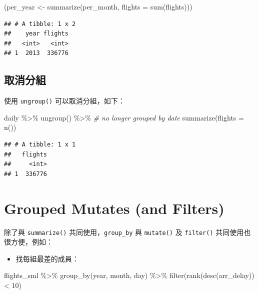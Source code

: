 \documentclass[
]{book}
\newenvironment{Shaded}{\begin{snugshade}}{\end{snugshade}}
\newcommand{\AttributeTok}[1]{\textcolor[rgb]{0.77,0.63,0.00}{#1}}
\newcommand{\CommentTok}[1]{\textcolor[rgb]{0.56,0.35,0.01}{\textit{#1}}}
\newcommand{\DecValTok}[1]{\textcolor[rgb]{0.00,0.00,0.81}{#1}}
\newcommand{\FunctionTok}[1]{\textcolor[rgb]{0.00,0.00,0.00}{#1}}
\newcommand{\NormalTok}[1]{#1}
\newcommand{\OtherTok}[1]{\textcolor[rgb]{0.56,0.35,0.01}{#1}}
\newcommand{\SpecialCharTok}[1]{\textcolor[rgb]{0.00,0.00,0.00}{#1}}
\providecommand{\tightlist}{%
  \setlength{\itemsep}{0pt}\setlength{\parskip}{0pt}}
\theoremstyle{definition}
\theoremstyle{remark}
\begin{document}
\begin{Shaded}
\begin{Highlighting}[]
\NormalTok{(per\_year }\OtherTok{\textless{}{-}} \FunctionTok{summarize}\NormalTok{(per\_month, }\AttributeTok{flights =} \FunctionTok{sum}\NormalTok{(flights)))}
\end{Highlighting}
\end{Shaded}

\begin{verbatim}
## # A tibble: 1 x 2
##    year flights
##   <int>   <int>
## 1  2013  336776
\end{verbatim}

\hypertarget{ux53d6ux6d88ux5206ux7d44}{%
\subsection{取消分組}\label{ux53d6ux6d88ux5206ux7d44}}

使用 \texttt{ungroup()} 可以取消分組，如下：

\begin{Shaded}
\begin{Highlighting}[]
\NormalTok{daily }\SpecialCharTok{\%\textgreater{}\%}
  \FunctionTok{ungroup}\NormalTok{() }\SpecialCharTok{\%\textgreater{}\%} \CommentTok{\# no longer grouped by date}
  \FunctionTok{summarize}\NormalTok{(}\AttributeTok{flights =} \FunctionTok{n}\NormalTok{())}
\end{Highlighting}
\end{Shaded}

\begin{verbatim}
## # A tibble: 1 x 1
##   flights
##     <int>
## 1  336776
\end{verbatim}

\hypertarget{grouped-mutates-and-filters}{%
\section{Grouped Mutates (and Filters)}\label{grouped-mutates-and-filters}}

除了與 \texttt{summarize()} 共同使用，\texttt{group\_by} 與 \texttt{mutate()} 及 \texttt{filter()} 共同使用也很方便，例如：

\begin{itemize}
\tightlist
\item
  找每組最差的成員：
\end{itemize}

\begin{Shaded}
\begin{Highlighting}[]
\NormalTok{flights\_sml }\SpecialCharTok{\%\textgreater{}\%}
  \FunctionTok{group\_by}\NormalTok{(year, month, day) }\SpecialCharTok{\%\textgreater{}\%}
  \FunctionTok{filter}\NormalTok{(}\FunctionTok{rank}\NormalTok{(}\FunctionTok{desc}\NormalTok{(arr\_delay)) }\SpecialCharTok{\textless{}} \DecValTok{10}\NormalTok{)}
\end{Highlighting}
\end{Shaded}
\end{document}
